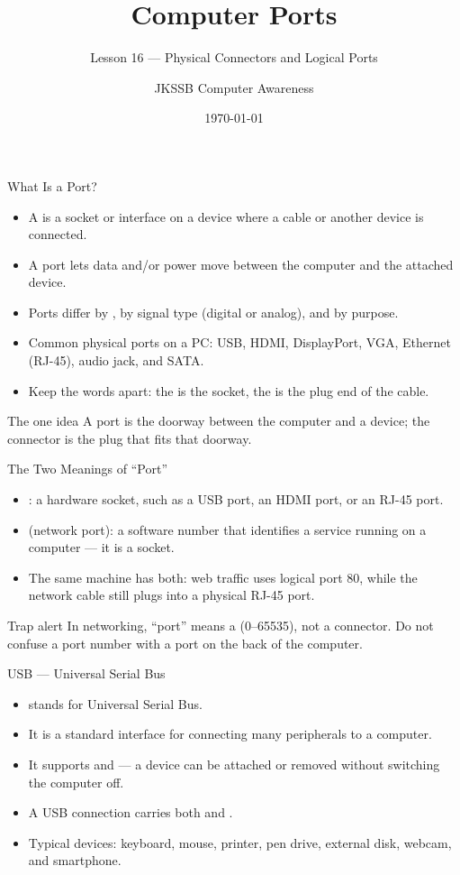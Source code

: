 \documentclass[aspectratio=169]{beamer}
\title{Computer Ports}
\subtitle{Lesson 16 --- Physical Connectors and Logical Ports}
\author{JKSSB Computer Awareness}
\date{\today}
\begin{document}
\frame{\titlepage}

\begin{frame}{What Is a Port?}
  \begin{itemize}
    \item A  is a socket or interface on a device where a cable or
      another device is connected.
    \item A port lets data and/or power move between the computer and the
      attached device.
    \item Ports differ by , by signal type (digital or analog), and
      by purpose.
    \item Common physical ports on a PC: USB, HDMI, DisplayPort, VGA,
      Ethernet (RJ-45), audio jack, and SATA.
    \item Keep the words apart: the  is the socket, the
       is the plug end of the cable.
  \end{itemize}
  \begin{block}{The one idea}
    A port is the doorway between the computer and a device; the connector is
    the plug that fits that doorway.
  \end{block}
\end{frame}

\begin{frame}{The Two Meanings of ``Port''}
  \begin{itemize}
    \item {}: a hardware socket, such as a USB port, an HDMI
      port, or an RJ-45 port.
    \item {} (network port): a software number that identifies
      a service running on a computer --- it is  a socket.
    \item The same machine has both: web traffic uses logical port 80, while
      the network cable still plugs into a physical RJ-45 port.
  \end{itemize}
  \begin{alertblock}{Trap alert}
    In networking, ``port'' means a  (0--65535), not a connector.
    Do not confuse a port number with a port on the back of the computer.
  \end{alertblock}
\end{frame}

\begin{frame}{USB --- Universal Serial Bus}
  \begin{itemize}
    \item {} stands for Universal Serial Bus.
    \item It is a standard interface for connecting many peripherals to a
      computer.
    \item It supports  and  --- a device
      can be attached or removed without switching the computer off.
    \item A USB connection carries both  and .
    \item Typical devices: keyboard, mouse, printer, pen drive, external disk,
      webcam, and smartphone.
  \end{itemize}
\end{frame}
\end{document}

